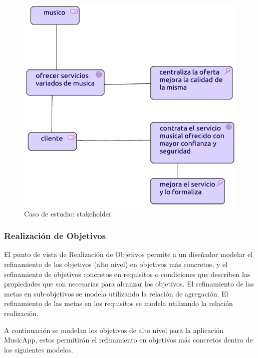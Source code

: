 \begin{figure}[h!]
	\centering
	\includegraphics[width=0.7\linewidth]{Desarrollo/ArquitecturaEmpresarial/Motivacion/imgs/stakeholder.pdf}
	\caption{Caso de estudio: stakeholder}
\end{figure}

\newpage

\subsubsection{Realización de Objetivos}
El punto de vista de Realización de Objetivos permite a un diseñador modelar el refinamiento de los objetivos (alto nivel) en objetivos más concretos, y el refinamiento de objetivos concretos en requisitos o condiciones que describen las propiedades que son necesarias para alcanzar los objetivos. El refinamiento de las metas en sub-objetivos se modela utilizando la relación de agregación. El refinamiento de las metas en los requisitos se modela utilizando la relación realización.  \vspace{\baselineskip}

A continuación se modelan los objetivos de alto nivel para la aplicación MusicApp, estos permitirán el refinamiento en objetivos más concretos dentro de los siguientes modelos.

